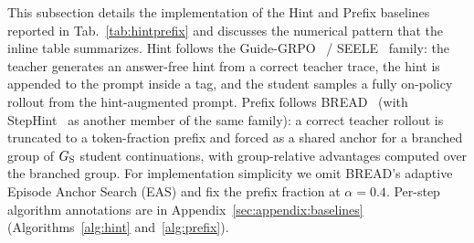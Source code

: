 \documentclass{llmxive}
\begin{document}
This subsection details the implementation of the Hint and Prefix baselines reported in Tab.~\ref{tab:hintprefix} and discusses the numerical pattern that the inline table summarizes. Hint follows the Guide-GRPO~\citep{nath2025adaptive} / SEELE~\citep{li2025staying} family: the teacher generates an answer-free hint from a correct teacher trace, the hint is appended to the prompt inside a tag, and the student samples a fully on-policy rollout from the hint-augmented prompt. Prefix follows BREAD~\citep{zhang2025bread} (with StepHint~\citep{zhang2025stephint} as another member of the same family): a correct teacher rollout is truncated to a token-fraction prefix and forced as a shared anchor for a branched group of $G_{\rm S}$ student continuations, with group-relative advantages computed over the branched group. For implementation simplicity we omit BREAD's adaptive Episode Anchor Search (EAS) and fix the prefix fraction at $\alpha\!=\!0.4$. Per-step algorithm annotations are in Appendix~\ref{sec:appendix:baselines} (Algorithms~\ref{alg:hint} and~\ref{alg:prefix}).
\end{document}
